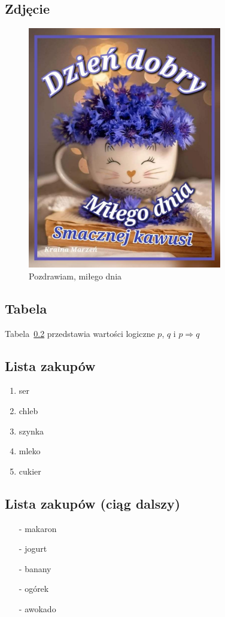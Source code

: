 \subsection{Zdjęcie}
\label{fig:milegodnia}
\begin{figure}[h]
\centering
\includegraphics[height = 300pt]{pictures/kasia.jpg}
\caption{Pozdrawiam, miłego dnia}
\end{figure}

\subsection{Tabela}
\label{tab:implikacja}
Tabela~\ref{tab:implikacja} przedstawia wartości logiczne $p$, $q$ i $p \Rightarrow q$



\subsection{Lista zakupów}
\begin{enumerate}
    \item ser
    \item chleb
    \item szynka
    \item mleko
    \item cukier
\end{enumerate}

\subsection{Lista zakupów (ciąg dalszy)}
\begin{itemize}
    \item[-] makaron
    \item[-] jogurt
    \item[-] banany
    \item[-] ogórek
    \item[-] awokado
\end{itemize}

